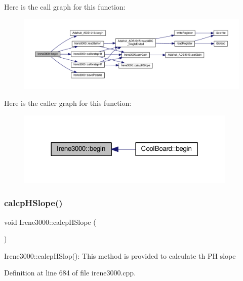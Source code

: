 Here is the call graph for this function\+:\nopagebreak
\begin{figure}[H]
\begin{center}
\leavevmode
\includegraphics[width=350pt]{d6/d03/class_irene3000_ad5891806c500ae1007afe52b9e304c2b_cgraph}
\end{center}
\end{figure}
Here is the caller graph for this function\+:\nopagebreak
\begin{figure}[H]
\begin{center}
\leavevmode
\includegraphics[width=297pt]{d6/d03/class_irene3000_ad5891806c500ae1007afe52b9e304c2b_icgraph}
\end{center}
\end{figure}
\mbox{\label{class_irene3000_a81f6a79e546679692053f7ac1af49613}} 
\subsubsection{\texorpdfstring{calcp\+H\+Slope()}{calcpHSlope()}}
{\footnotesize\ttfamily void Irene3000\+::calcp\+H\+Slope (\begin{DoxyParamCaption}{ }\end{DoxyParamCaption})}

Irene3000\+::calcp\+H\+Slop()\+: This method is provided to calculate th PH slope 

Definition at line 684 of file irene3000.\+cpp.


